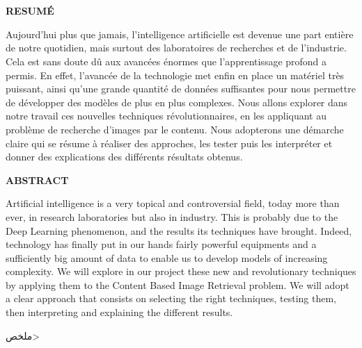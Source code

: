 
\chapter*{}%


\begin{center}
\begin{Huge}
\textbf{RESUMÉ}\\

\end{Huge}
\end{center}

	Aujourd'hui plus que jamais, l'intelligence artificielle est devenue une part entière de notre quotidien, mais surtout des laboratoires de recherches et de l'industrie. Cela est sans doute dû aux avancées énormes que l'apprentissage profond a permis. En effet, l'avancée de la technologie met enfin en place un matériel très puissant, ainsi qu'une grande quantité de données suffisantes pour nous permettre de développer des modèles de plus en plus complexes. Nous allons explorer dans notre travail ces nouvelles techniques révolutionnaires, en les appliquant au problème de recherche d'images par le contenu. Nous adopterons une démarche claire qui se résume à réaliser des approches, les tester puis les interpréter et donner des explications des différents résultats obtenus.\\

\begin{center}
\begin{Huge}
\textbf{ABSTRACT}
\end{Huge}
\end{center}

	Artificial intelligence is a very topical and controversial field, today more than ever, in research laboratories but also in industry. This is probably due to the Deep Learning phenomenon, and the results its techniques have brought. Indeed, technology has finally put in our hands fairly powerful equipments and a sufficiently big amount of data to enable us to develop models of increasing complexity. We will explore in our project these new and revolutionary techniques by applying them to the Content Based Image Retrieval problem. We will adopt a clear approach that consists on selecting the right techniques, testing them, then interpreting and explaining the different results.\\


\begin{center}
\begin{Huge}
\<ملخص>\\
\end{Huge}
\end{center}

